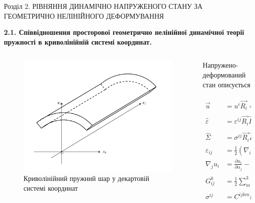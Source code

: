 \documentclass[8pt]{beamer}
\numberwithin{figure}{section}
\numberwithin{equation}{section}
\numberwithin{table}{section}
\begin{document}
\begin{frame}{Розділ 2. РІВНЯННЯ ДИНАМІЧНО НАПРУЖЕНОГО СТАНУ ЗА ГЕОМЕТРИЧНО НЕЛІНІЙНОГО ДЕФОРМУВАННЯ}

\textbf{2.1. Співвідношення просторової геометрично нелінійної динамічної теорії пружності в криволінійній системі координат.
}

\begin{columns}
	\begin{column}{0.35\linewidth}
		\begin{figure}
			\includegraphics[scale=0.15]{pic/layer.png}
			\caption{Криволінійний пружний шар у декартовій системі координат}
			\label{fig:21}
		\end{figure}
	\end{column}
	\begin{column}{0.65\textwidth}
    	\begin{center}
	    	Напружено-деформований стан описується
    	\end{center}
\begin{align}
\vec{u} &= u^i \vec{R_i}=u_i \vec{R^i},\\
\hat{\varepsilon} &= \varepsilon^{ij} \vec{R_i}\vec{R_j}=\varepsilon_{ij} \vec{R^i}\vec{R^j},\\
\hat{\Sigma} &= \sigma^{ij} \vec{R_i}\vec{R_j}=\sigma_{ij} \vec{R^i}\vec{R^j},\\
\varepsilon_{ij} &= \frac{1}{2} \left( \nabla_i u_j + \nabla_j u_i + \nabla_i u^j \nabla_j u_k \right),\\
\nabla_j u_i &= \frac{ \partial u_i }{ \partial \alpha_j } - u_k G ^k _{ij},\\
G ^k _{ij} &= \frac12 \sum_{m=1}^{3} g^{km} 
\left(
\frac{\partial g_{im}}{\partial \alpha_j} + \frac{\partial g_{jm}}{\partial \alpha_i} - \frac{\partial g_{ij}}{\partial \alpha_m} 
\right), \\
\sigma^{ij} &= C^{ijkm}\varepsilon_{km}.
\end{align}
	\end{column}
\end{columns}


\end{frame}
\end{document}
